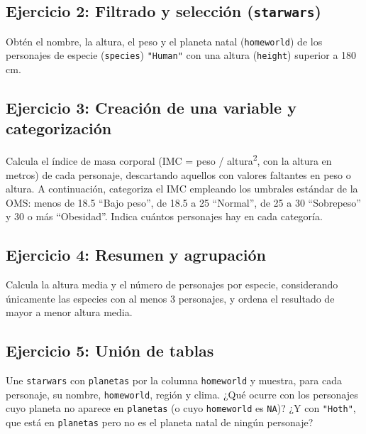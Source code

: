 \documentclass[
]{book}
\theoremstyle{break}
\theoremstyle{nonumberplain}
\begin{document}
\subsection{\texorpdfstring{Ejercicio 2: Filtrado y selección (\texttt{starwars})}{Ejercicio 2: Filtrado y selección (starwars)}}\label{ejercicio-2-filtrado-y-selecciuxf3n-starwars}

Obtén el nombre, la altura, el peso y el planeta natal (\texttt{homeworld}) de los
personajes de especie (\texttt{species}) \texttt{"Human"} con una altura (\texttt{height})
superior a 180 cm.

\subsection{Ejercicio 3: Creación de una variable y categorización}\label{ejercicio-3-creaciuxf3n-de-una-variable-y-categorizaciuxf3n}

Calcula el índice de masa corporal (IMC = peso / altura\textsuperscript{2}, con la altura en
metros) de cada personaje, descartando aquellos con valores faltantes en
peso o altura. A continuación, categoriza el IMC empleando los umbrales
estándar de la OMS: menos de 18.5 ``Bajo peso'', de 18.5 a 25 ``Normal'', de 25
a 30 ``Sobrepeso'' y 30 o más ``Obesidad''. Indica cuántos personajes hay en
cada categoría.

\subsection{Ejercicio 4: Resumen y agrupación}\label{ejercicio-4-resumen-y-agrupaciuxf3n}

Calcula la altura media y el número de personajes por especie, considerando
únicamente las especies con al menos 3 personajes, y ordena el resultado de
mayor a menor altura media.

\subsection{Ejercicio 5: Unión de tablas}\label{ejercicio-5-uniuxf3n-de-tablas}

Une \texttt{starwars} con \texttt{planetas} por la columna \texttt{homeworld} y muestra, para cada
personaje, su nombre, \texttt{homeworld}, región y clima. ¿Qué ocurre con los
personajes cuyo planeta no aparece en \texttt{planetas} (o cuyo \texttt{homeworld} es
\texttt{NA})? ¿Y con \texttt{"Hoth"}, que está en \texttt{planetas} pero no es el planeta natal de
ningún personaje?
\end{document}
